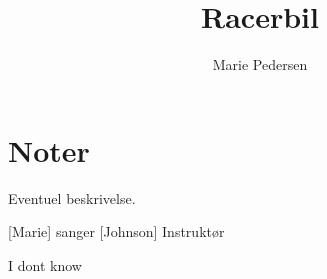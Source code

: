 \documentclass{article}
\title{Racerbil}                   %
\author{Marie Pedersen}  %
\begin{document}
                
\maketitle
\section*{Noter}                %
Eventuel beskrivelse.

\begin{roles}
[Marie] sanger
[Johnson] Instruktør
\end{roles}

\begin{props}
     I dont know
\end{props}
\end{document}
